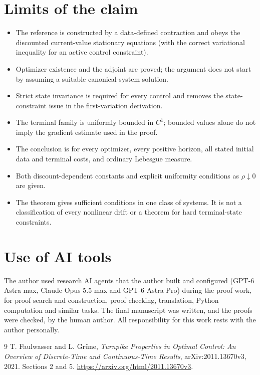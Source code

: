 \documentclass[11pt,a4paper]{article}
\begin{document}
\section{Limits of the claim}
\begin{itemize}
\item The reference is constructed by a data-defined contraction and
obeys the discounted current-value stationary equations (with the correct
variational inequality for an active control constraint).
\item Optimizer existence and the adjoint are proved; the argument does
not start by assuming a suitable canonical-system solution.
\item Strict state invariance is required for every control and removes
the state-constraint issue in the first-variation derivation.
\item The terminal family is uniformly bounded in $C^1$; bounded values
alone do not imply the gradient estimate used in the proof.
\item The conclusion is for every optimizer, every positive horizon,
all stated initial data and terminal costs, and ordinary Lebesgue measure.
\item Both discount-dependent constants and explicit uniformity
conditions as $\rho\downarrow0$ are given.
\item The theorem gives sufficient conditions in one class of systems.
It is not a classification of every nonlinear drift or a theorem
for hard terminal-state constraints.
\end{itemize}

\section*{Use of AI tools}
The author used research AI agents that the author built and configured (GPT-6 Astra max,
Claude Opus 5.5 max and GPT-6 Astra Pro) during the proof work, for proof search and
construction, proof checking, translation, Python computation and similar tasks. The final
manuscript was written, and the proofs were checked, by the human author. All responsibility
for this work rests with the author personally.

\begin{thebibliography}{9}
T. Faulwasser and L. Gr\"une,
\emph{Turnpike Properties in Optimal Control: An Overview of Discrete-Time
and Continuous-Time Results}, arXiv:2011.13670v3, 2021.
Sections 2 and 5.
\url{https://arxiv.org/html/2011.13670v3}.
\end{thebibliography}
\end{document}
